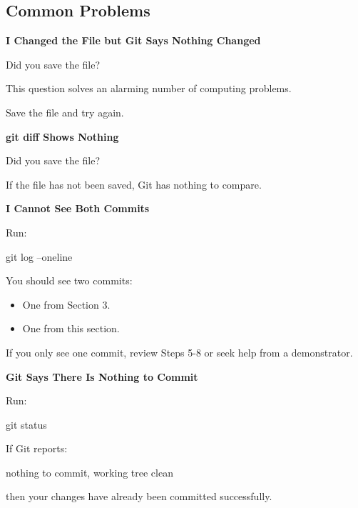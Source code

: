 \documentclass{csc2059practical}
\begin{document}
\subsection{Common Problems}
\begin{commonerror}
\textbf{I Changed the File but Git Says Nothing Changed}\par
\medskip

Did you save the file?


This question solves an alarming number of computing problems.


Save the file and try again.


\end{commonerror}
\begin{commonerror}
\textbf{git diff Shows Nothing}\par
\medskip

Did you save the file?


If the file has not been saved, Git has nothing to compare.


\end{commonerror}
\begin{commonerror}
\textbf{I Cannot See Both Commits}\par
\medskip

Run:


\begin{terminalplain}
  git log --oneline
\end{terminalplain}
You should see two commits:

\begin{itemize}
  \item One from Section 3.
  \item One from this section.
\end{itemize}
If you only see one commit, review Steps 5-8 or seek help from a demonstrator.
\end{commonerror}

\begin{commonerror}
\textbf{Git Says There Is Nothing to Commit}\par
\medskip

Run:


\begin{terminalplain}
  git status
\end{terminalplain}
If Git reports:

\begin{terminalplain}
  nothing to commit, working tree clean
\end{terminalplain}
then your changes have already been committed successfully.
\end{commonerror}
\end{document}

